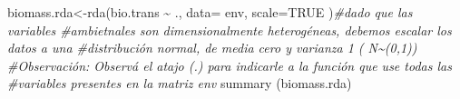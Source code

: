 \documentclass[
]{book}
\newenvironment{Shaded}{\begin{snugshade}}{\end{snugshade}}
\newcommand{\AttributeTok}[1]{\textcolor[rgb]{0.77,0.63,0.00}{#1}}
\newcommand{\CommentTok}[1]{\textcolor[rgb]{0.56,0.35,0.01}{\textit{#1}}}
\newcommand{\ConstantTok}[1]{\textcolor[rgb]{0.00,0.00,0.00}{#1}}
\newcommand{\FunctionTok}[1]{\textcolor[rgb]{0.00,0.00,0.00}{#1}}
\newcommand{\NormalTok}[1]{#1}
\newcommand{\OtherTok}[1]{\textcolor[rgb]{0.56,0.35,0.01}{#1}}
\newcommand{\SpecialCharTok}[1]{\textcolor[rgb]{0.00,0.00,0.00}{#1}}
\begin{document}
\begin{Shaded}
\begin{Highlighting}[]
\NormalTok{biomass.rda}\OtherTok{\textless{}{-}}\FunctionTok{rda}\NormalTok{(bio.trans }\SpecialCharTok{\textasciitilde{}}\NormalTok{ ., }\AttributeTok{data=}\NormalTok{ env, }\AttributeTok{scale=}\ConstantTok{TRUE}\NormalTok{ )}\CommentTok{\#dado que las variables \#ambietnales son dimensionalmente heterogéneas, debemos escalar los datos a una \#distribución normal, de media cero y varianza 1 ( N\textasciitilde{}(0,1))}
\CommentTok{\#Observación: Observá el atajo (.) para indicarle a la función que use todas las \#variables presentes en la matriz env}
\FunctionTok{summary}\NormalTok{ (biomass.rda)}
\end{Highlighting}
\end{Shaded}
\end{document}
